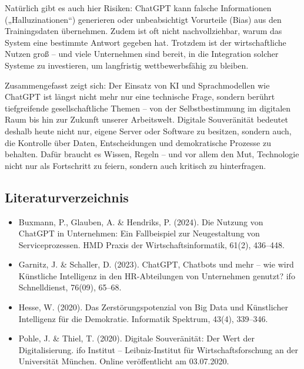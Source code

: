 \documentclass[utf8,biblatex]{bremerhaven_lni}
\begin{document}
Natürlich gibt es auch hier Risiken: ChatGPT kann falsche Informationen („Halluzinationen“) generieren oder unbeabsichtigt Vorurteile (Bias) aus den Trainingsdaten übernehmen. Zudem ist oft nicht nachvollziehbar, warum das System eine bestimmte Antwort gegeben hat. Trotzdem ist der wirtschaftliche Nutzen groß – und viele Unternehmen sind bereit, in die Integration solcher Systeme zu investieren, um langfristig wettbewerbsfähig zu bleiben.

Zusammengefasst zeigt sich: Der Einsatz von KI und Sprachmodellen wie ChatGPT ist längst nicht mehr nur eine technische Frage, sondern berührt tiefgreifende gesellschaftliche Themen – von der Selbstbestimmung im digitalen Raum bis hin zur Zukunft unserer Arbeitswelt. Digitale Souveränität bedeutet deshalb heute nicht nur, eigene Server oder Software zu besitzen, sondern auch, die Kontrolle über Daten, Entscheidungen und demokratische Prozesse zu behalten. Dafür braucht es Wissen, Regeln – und vor allem den Mut, Technologie nicht nur als Fortschritt zu feiern, sondern auch kritisch zu hinterfragen.


\subsection{Literaturverzeichnis}

\begin{itemize}
  \item Buxmann, P., Glauben, A. & Hendriks, P. (2024). Die Nutzung von ChatGPT in Unternehmen: Ein Fallbeispiel zur Neugestaltung von Serviceprozessen. HMD Praxis der Wirtschaftsinformatik, 61(2), 436–448.
  
  \item Garnitz, J. & Schaller, D. (2023). ChatGPT, Chatbots und mehr – wie wird Künstliche Intelligenz in den HR-Abteilungen von Unternehmen genutzt? ifo Schnelldienst, 76(09), 65–68.
  
  \item Hesse, W. (2020). Das Zerstörungspotenzial von Big Data und Künstlicher Intelligenz für die Demokratie. Informatik Spektrum, 43(4), 339–346.
  
  \item Pohle, J. & Thiel, T. (2020). Digitale Souveränität: Der Wert der Digitalisierung. ifo Institut – Leibniz-Institut für Wirtschaftsforschung an der Universität München. Online veröffentlicht am 03.07.2020.
\end{itemize}





\printbibliography
\end{document}
